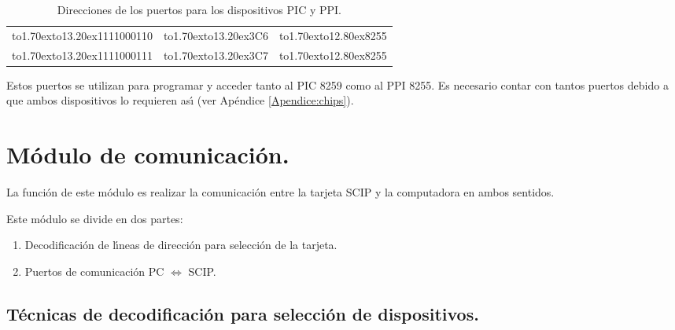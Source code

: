 \begin{table}[!htb]
\begin{tabular}{|l|l|l|}
\cline{1-3}
\vbox to1.70ex{\vspace{1pt}\vfil\hbox to13.20ex{\hfil 1111000110\hfil}\vfil} & 
\vbox to1.70ex{\vspace{1pt}\vfil\hbox to13.20ex{\hfil 3C6\hfil}\vfil} & 
\vbox to1.70ex{\vspace{1pt}\vfil\hbox to12.80ex{\hfil 8255\hfil}\vfil} \\

\cline{1-3}
\vbox to1.70ex{\vspace{1pt}\vfil\hbox to13.20ex{\hfil 1111000111\hfil}\vfil} & 
\vbox to1.70ex{\vspace{1pt}\vfil\hbox to13.20ex{\hfil 3C7\hfil}\vfil} & 
\vbox to1.70ex{\vspace{1pt}\vfil\hbox to12.80ex{\hfil 8255\hfil}\vfil} \\

\cline{1-3}
\end{tabular}
\caption{Direcciones de los puertos para los dispositivos PIC y PPI.}
\label{Tabla:puertointernos}
\end{table}

Estos puertos se utilizan para programar y acceder tanto al PIC 8259 como al PPI 8255. Es %
necesario contar con tantos puertos debido a que ambos dispositivos lo requieren as\'{\i} (ver %
Ap\'endice \ref{Apendice:chips}).


\section{M\'odulo de comunicaci\'on.}
\label{Section:decodifbus}

La funci\'on de este m\'odulo es realizar la comunicaci\'on entre la tarjeta SCIP y la %
computadora en ambos sentidos.

Este m\'odulo se divide en dos partes:

\begin{enumerate}
\item Decodificaci\'on de l\'{\i}neas de direcci\'on para selecci\'on de la tarjeta.
\item Puertos de comunicaci\'on PC $\Longleftrightarrow$ SCIP.
\end{enumerate}


\subsection{T\'ecnicas de decodificaci\'on para selecci\'on de dispositivos.}
\label{Subsection:tecnicas}

